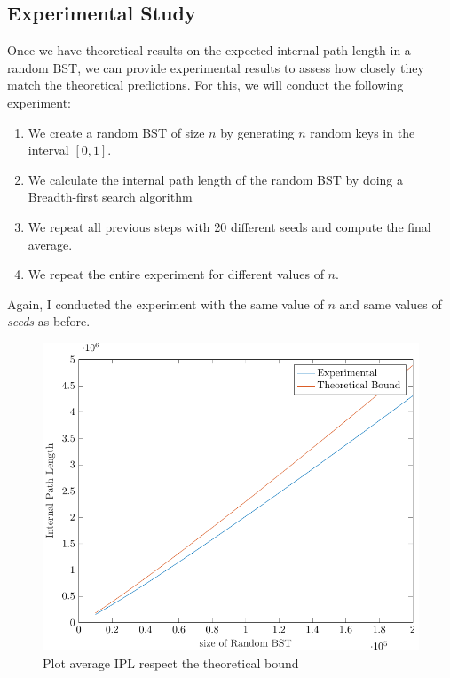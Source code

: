 \subsection{Experimental Study}
Once we have theoretical results on the expected internal path length in a random BST, we can provide experimental results to assess how closely they match the theoretical predictions. For this, we will conduct the following experiment:

\begin{enumerate}
    \item We create a random BST of size \( n \) by generating \( n \) random keys in the interval \( [0,1] \).
    \item We calculate the internal path length of the random BST by doing a Breadth-first search algorithm
    \item We repeat all previous steps with 20 different seeds and compute the final average.
    \item We repeat the entire experiment for different values of \( n \).
\end{enumerate}

Again, I conducted the experiment with the same value of $n$ and same values of \textit{seeds} as before. 

\begin{figure}
    \centering
    \includegraphics[scale=0.65]{plotIPL.pdf}
    \caption{Plot average IPL respect the theoretical bound}
    \label{fig:plotBoundIPL}
\end{figure}
